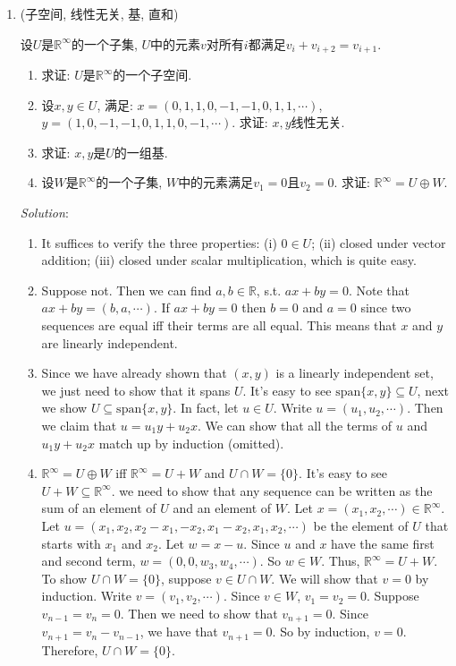 \documentclass[a4paper]{article}
\newcommand\spa{\mathrm{span}}  %
\newcommand\R{\mathbb{R}}  %
\begin{document}
\begin{enumerate}
	\item (子空间, 线性无关, 基, 直和)

	设$U$是$\R^\infty$的一个子集, $U$中的元素$v$对所有$i$都满足$v_i + v_{i + 2} = v_{i + 1}$.
		\begin{enumerate}[(1)]
			\item 求证: $U$是$\R^\infty$的一个子空间.
			\item 设$x, y \in U$, 满足: $x = (0, 1, 1, 0, -1, -1, 0, 1, 1, \cdots)$, $y = (1, 0, -1, -1, 0, 1, 1, 0, -1, \cdots)$. 求证: $x, y$线性无关.
			\item 求证: $x, y$是$U$的一组基.
			\item 设$W$是$\R^\infty$的一个子集, $W$中的元素满足$v_1 = 0$且$v_2 = 0$. 求证: $\R^\infty = U \oplus W$.
		\end{enumerate}

	\emph{Solution}:
	\begin{enumerate}[(1)]
		\item It suffices to verify the three properties: (i) $0 \in U$; (ii) closed under vector addition; (iii) closed under scalar multiplication, which is quite easy.
		\item Suppose not. Then we can find $a, b \in \R$, s.t. $ax + by = 0$. Note that $ax + by = (b, a, \cdots)$. If $ax + by = 0$ then $b = 0$ and $a = 0$ since two sequences are equal iff their terms are all equal. This means that $x$ and $y$ are linearly independent.
		\item Since we have already shown that $(x, y)$ is a linearly independent set, we just need to show that it spans $U$. It's easy to see $\spa \{x, y\} \subseteq U$, next we show $U \subseteq \spa\{x, y\}$. In fact, let $u \in U$. Write $u = (u_1, u_2, \cdots)$. Then we claim that $u = u_1y + u_2 x$. We can show that all the terms of $u$ and $u_1y + u_2x$ match up by induction (omitted).
		\item $\R^\infty = U \oplus W$ iff $\R^\infty = U + W$ and $U \cap W = \{ 0\}$. It's easy to see $U+W \subseteq \R^\infty$. we need to show that any sequence can be written as the sum of an element of $U$ and an element of $W$. Let $x = (x_1, x_2, \cdots) \in \R^\infty$. Let $u = (x_1, x_2, x_2 - x_1, -x_2, x_1 - x_2, x_1, x_2, \cdots)$ be the element of $U$ that starts with $x_1$ and $x_2$. Let $w = x - u$. Since $u$ and $x$ have the same first and second term, $w = (0, 0, w_3, w_4, \cdots)$. So $w \in W$. Thus, $\R^\infty = U + W$.\\
		To show $U \cap W = \{ 0\}$, suppose $v \in U \cap W$. We will show that $v = 0$ by induction. Write $v = (v_1, v_2, \cdots)$. Since $v \in W$, $v_1 = v_2 = 0$. Suppose $v_{n - 1} = v_n = 0$. Then we need to show that $v_{n+1} = 0$. Since $v_{n+1} = v_n - v_{n-1}$, we have that $v_{n+1} = 0$. So by induction, $v = 0$. Therefore, $U \cap W = \{ 0\}$.
	\end{enumerate}
	

\end{enumerate}
\end{document}
